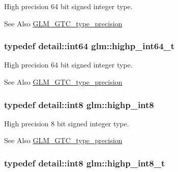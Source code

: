 High precision 64 bit signed integer type. \begin{DoxySeeAlso}{See Also}
\hyperlink{group__gtc__type__precision}{G\-L\-M\-\_\-\-G\-T\-C\-\_\-type\-\_\-precision} 
\end{DoxySeeAlso}
\hypertarget{group__gtc__type__precision_ga0f5186bde44471133b08057cae8a51ac}{
\subsubsection[{highp\-\_\-int64\-\_\-t}]{\setlength{\rightskip}{0pt plus 5cm}typedef detail\-::int64 {\bf glm\-::highp\-\_\-int64\-\_\-t}}}\label{group__gtc__type__precision_ga0f5186bde44471133b08057cae8a51ac}
High precision 64 bit signed integer type. \begin{DoxySeeAlso}{See Also}
\hyperlink{group__gtc__type__precision}{G\-L\-M\-\_\-\-G\-T\-C\-\_\-type\-\_\-precision} 
\end{DoxySeeAlso}
\hypertarget{group__gtc__type__precision_ga57c86999e666760c304453f9bfdc09d1}{
\subsubsection[{highp\-\_\-int8}]{\setlength{\rightskip}{0pt plus 5cm}typedef detail\-::int8 {\bf glm\-::highp\-\_\-int8}}}\label{group__gtc__type__precision_ga57c86999e666760c304453f9bfdc09d1}
High precision 8 bit signed integer type. \begin{DoxySeeAlso}{See Also}
\hyperlink{group__gtc__type__precision}{G\-L\-M\-\_\-\-G\-T\-C\-\_\-type\-\_\-precision} 
\end{DoxySeeAlso}
\hypertarget{group__gtc__type__precision_ga417701b99e6e7992f35ab2ef694f88b2}{
\subsubsection[{highp\-\_\-int8\-\_\-t}]{\setlength{\rightskip}{0pt plus 5cm}typedef detail\-::int8 {\bf glm\-::highp\-\_\-int8\-\_\-t}}}\label{group__gtc__type__precision_ga417701b99e6e7992f35ab2ef694f88b2}
